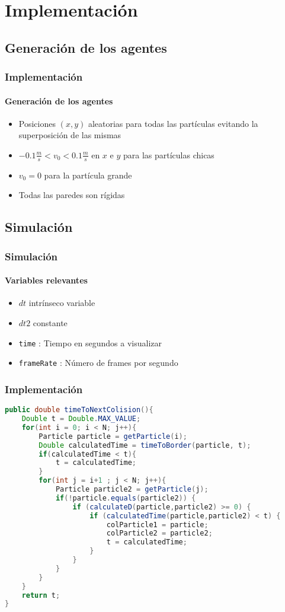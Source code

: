 \documentclass[hyperref={pdfpagelayout=SinglePage}]{beamer}
\begin{document}
\section{Implementación}

\subsection{Generación de los agentes}

\begin{frame}
\frametitle{Implementación}
\framesubtitle{Generación de los agentes}
\begin{itemize}
	\item Posiciones $(x,y)$ aleatorias para todas las partículas evitando la superposición de las mismas
	\item $-0.1 \frac{m}{s} < v_{0} < 0.1 \frac{m}{s}$ en $x$ e $y$ para las partículas chicas
	\item $v_{0} = 0$ para la partícula grande
	\item Todas las paredes son rígidas
\end{itemize}
\end{frame}

\subsection{Simulación}

\begin{frame}
\frametitle{Simulación}
\framesubtitle{Variables relevantes}
\begin{itemize}
	\item $dt$ intrínseco variable
	\item $dt2$ constante
	\item \texttt{time} : Tiempo en segundos a visualizar
	\item \texttt{frameRate} : Número de frames por segundo
\end{itemize}
\end{frame}

\begin{frame}[fragile]
\frametitle{Implementación}
\begin{lstlisting}[language=Java, caption = Función para obtener el tiempo de la próxima colisión.]
public double timeToNextColision(){
	Double t = Double.MAX_VALUE;
	for(int i = 0; i < N; j++){
		Particle particle = getParticle(i);
		Double calculatedTime = timeToBorder(particle, t);
		if(calculatedTime < t){
			t = calculatedTime;
		}
		for(int j = i+1 ; j < N; j++){
			Particle particle2 = getParticle(j);
			if(!particle.equals(particle2)) {
				if (calculateD(particle,particle2) >= 0) {
					if (calculatedTime(particle,particle2) < t) {
						colParticle1 = particle;
						colParticle2 = particle2;
						t = calculatedTime;
					}
				}
			}
		}
	}
	return t;
}
\end{lstlisting}
\end{frame}
\end{document}
